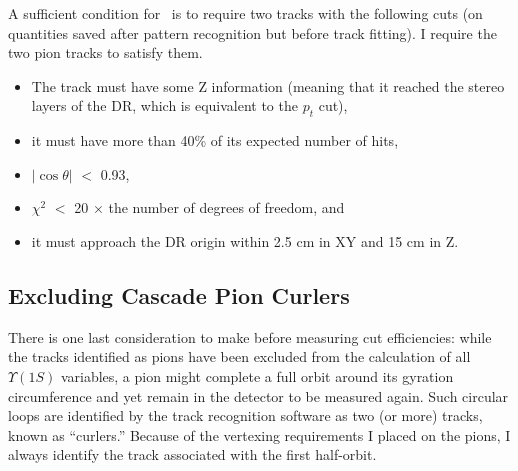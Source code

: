 A sufficient condition for \lfourdec\ is to require two tracks with
the following cuts (on quantities saved after pattern recognition but
before track fitting).  I require the two pion tracks to satisfy them.
\begin{itemize}
  \item The track must have some Z information (meaning that it
    reached the stereo layers of the DR, which is equivalent to the
    $p_t$ cut),

  \item it must have more than 40\% of its expected number of hits,

  \item $|\cos\theta|$ $<$ 0.93,

  \item $\chi^2$ $<$ 20 $\times$ the number of degrees of freedom, and

  \item it must approach the DR origin within 2.5 cm in XY and 15 cm
    in Z.
\end{itemize}

\subsection{Excluding Cascade Pion Curlers}

There is one last consideration to make before measuring cut
efficiencies: while the tracks identified as pions have been excluded
from the calculation of all $\Upsilon(1S)$ variables, a pion might
complete a full orbit around its gyration circumference and yet remain
in the detector to be measured again.  Such circular loops are
identified by the track recognition software as two (or more) tracks,
known as ``curlers.''  Because of the vertexing requirements I placed
on the pions, I always identify the track associated with the first
half-orbit.

